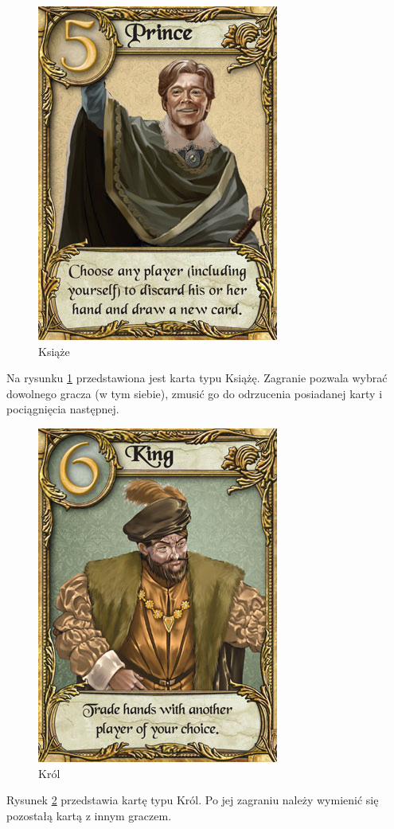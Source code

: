 \clearpage
\begin{figure}[h]
	\centering
	\includegraphics[scale=0.5]{Resources/Love_Letter_Card_Prince.png}
	\caption{Książe} \label{fig:Love_Letter_Card_Prince}
\end{figure}
Na rysunku \ref{fig:Love_Letter_Card_Prince} przedstawiona jest karta typu Książę. Zagranie pozwala wybrać dowolnego gracza (w tym siebie), zmusić go do odrzucenia posiadanej karty i pociągnięcia następnej.

\begin{figure}[h]
	\centering
	\includegraphics[scale=0.5]{Resources/Love_Letter_Card_King.png}
	\caption{Król} \label{fig:Love_Letter_Card_King}
\end{figure}
Rysunek \ref{fig:Love_Letter_Card_King} przedstawia kartę typu Król. Po jej zagraniu należy wymienić się pozostałą kartą z innym graczem.

